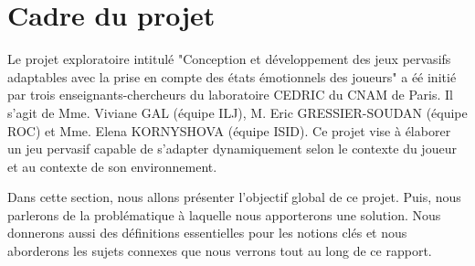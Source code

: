 \documentclass{article}
\begin{document}
\section{Cadre du projet}\label{sec:projet}
	Le projet exploratoire intitulé "Conception et développement des jeux pervasifs adaptables avec la prise en compte des états émotionnels des joueurs" a éé initié par trois enseignants-chercheurs du laboratoire CEDRIC du CNAM de Paris.
	Il s'agit de Mme. Viviane GAL (équipe ILJ), M. Eric GRESSIER-SOUDAN (équipe ROC) et Mme. Elena KORNYSHOVA (équipe ISID).
	Ce projet vise à élaborer un jeu pervasif capable de s'adapter dynamiquement selon le contexte du joueur et au contexte de son environnement.\par
	Dans cette section, nous allons présenter l'objectif global de ce projet.
	Puis, nous parlerons de la problématique à laquelle nous apporterons une solution.
	Nous donnerons aussi des définitions essentielles pour les notions clés et nous aborderons les sujets connexes que nous verrons tout au long de ce rapport.
\end{document}
